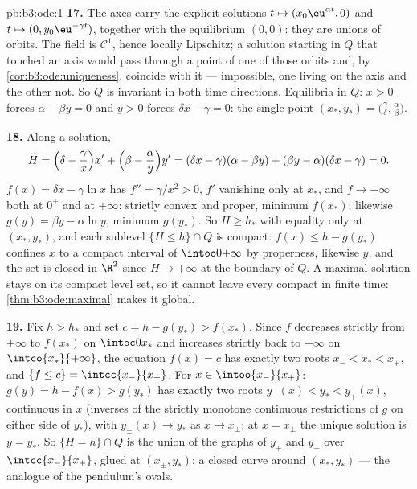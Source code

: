 \begin{solution}{pb:b3:ode:1}
\textbf{17.} The axes carry the explicit solutions $t
\mapsto (x_0\eu^{\alpha t}, 0)$ and $t \mapsto (0,
y_0\eu^{-\gamma t})$, together with the equilibrium
$(0, 0)$: they are unions of orbits. The field is $\mathcal
C^1$, hence locally Lipschitz; a solution starting in $Q$
that touched an axis would pass through a point of one of
those orbits and, by \cref{cor:b3:ode:uniqueness}, coincide
with it --- impossible, one living on the axis and the other
not. So $Q$ is invariant in both time directions.
Equilibria in $Q$: $x > 0$ forces $\alpha - \beta y = 0$ and
$y > 0$ forces $\delta x - \gamma = 0$: the single point
$(x_*, y_*) = \bigl(\frac\gamma\delta,
\frac\alpha\beta\bigr)$.

\textbf{18.} Along a solution,
\[
\dot H = \Bigl(\delta - \frac\gamma x\Bigr)x' +
\Bigl(\beta - \frac\alpha y\Bigr)y'
= (\delta x - \gamma)(\alpha - \beta y) +
(\beta y - \alpha)(\delta x - \gamma) = 0 .
\]
$f(x) = \delta x - \gamma\ln x$ has $f'' = \gamma/x^2 > 0$,
$f'$ vanishing only at $x_*$, and $f \to +\infty$ both at
$0^+$ and at $+\infty$: strictly convex and proper, minimum
$f(x_*)$; likewise $g(y) = \beta y - \alpha\ln y$, minimum
$g(y_*)$. So $H \geq h_*$ with equality only at $(x_*,
y_*)$, and each sublevel $\{H \leq h\}\cap Q$ is compact:
$f(x) \leq h - g(y_*)$ confines $x$ to a compact interval of
$\intoo0{+\infty}$ by properness, likewise $y$, and the set
is closed in $\R^2$ since $H \to +\infty$ at the boundary of
$Q$. A maximal solution stays on its compact level set, so
it cannot leave every compact in finite time:
\cref{thm:b3:ode:maximal} makes it global.

\textbf{19.} Fix $h > h_*$ and set $c = h - g(y_*) >
f(x_*)$. Since $f$ decreases strictly from $+\infty$ to
$f(x_*)$ on $\intoc0{x_*}$ and increases strictly back to
$+\infty$ on $\intco{x_*}{+\infty}$, the equation $f(x) = c$
has exactly two roots $x_- < x_* < x_+$, and $\{f \leq c\} =
\intcc{x_-}{x_+}$. For $x \in \intoo{x_-}{x_+}$: $g(y) = h -
f(x) > g(y_*)$ has exactly two roots $y_-(x) < y_* <
y_+(x)$, continuous in $x$ (inverses of the strictly
monotone continuous restrictions of $g$ on either side of
$y_*$), with $y_\pm(x) \to y_*$ as $x \to x_\pm$; at $x =
x_\pm$ the unique solution is $y = y_*$. So $\{H = h\}\cap
Q$ is the union of the graphs of $y_+$ and $y_-$ over
$\intcc{x_-}{x_+}$, glued at $(x_\pm, y_*)$: a closed curve
around $(x_*, y_*)$ --- the analogue of the pendulum's
ovals.


\end{solution}

